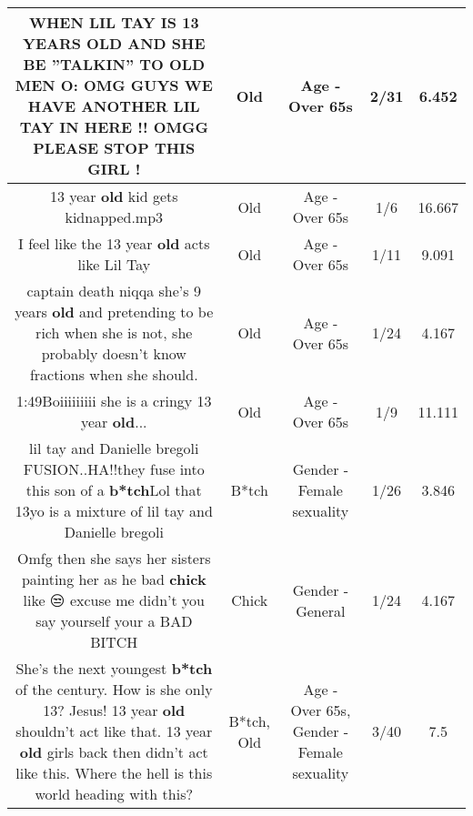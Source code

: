 \documentclass[11pt]{article}
\newlength\mylength
\begin{document}
\begin{center}
\begin{longtable}{|C{.65\mylength}|C{.30\mylength}|C{.12\mylength}|C{.12\mylength}|C{.12\mylength}|}
  \small WHEN LIL TAY IS 13 YEARS \textbf{OLD} AND SHE BE ''TALKIN'' TO \textbf{OLD} MEN O: OMG GUYS WE HAVE ANOTHER LIL TAY IN HERE !! OMGG PLEASE STOP THIS GIRL !\normalsize   & Old & Age - Over 65s & 2/31 & 6.452 \\  \hline
  \small 13 year \textbf{old} kid gets kidnapped.mp3\normalsize   & Old & Age - Over 65s & 1/6 & 16.667 \\  \hline
  \small I feel like the 13 year \textbf{old} acts like Lil Tay\normalsize   & Old & Age - Over 65s & 1/11 & 9.091 \\  \hline
  \small captain death niqqa she's 9 years \textbf{old} and pretending to be rich when she is not, she probably doesn't know fractions when she should.\normalsize   & Old & Age - Over 65s & 1/24 & 4.167 \\  \hline
  \small 1:49Boiiiiiiiii she is a cringy 13 year \textbf{old}...\normalsize   & Old & Age - Over 65s & 1/9 & 11.111 \\  \hline
  \small lil tay and Danielle bregoli FUSION..HA!!they fuse into this son of a \textbf{b*tch}Lol that 13yo is a mixture of lil tay and Danielle bregoli\normalsize   & B*tch & Gender - Female sexuality & 1/26 & 3.846 \\  \hline
  \small Omfg then she says her sisters painting her as he bad \textbf{chick} like 😒 excuse me didn't you say yourself your a BAD BITCH\normalsize   & Chick & Gender - General & 1/24 & 4.167 \\  \hline
  \small She's the next youngest \textbf{b*tch} of the century. How is she only 13? Jesus! 13 year \textbf{old} shouldn't act like that. 13 year \textbf{old} girls back then didn't act like this. Where the hell is this world heading with this?\normalsize   & B*tch, Old & Age - Over 65s, Gender - Female sexuality & 3/40 & 7.5 \\  \hline

\end{longtable}
\end{center}
\end{document}
